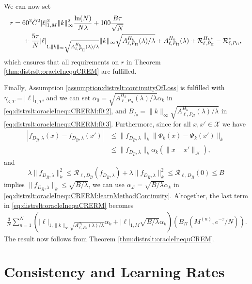\documentclass[letterpaper]{article} %
\newcommand{\fm}{\Phi} %
\newcommand{\hs}[1]{\mathcal{#1}} %
\newcommand{\inputSet}{\mathcal{X}} %
\newcommand{\risk}{\mathcal{R}} %
\newcommand{\Risk}[2]{\risk_{{#1},{#2}}} %
\newcommand{\RiskBayes}[2]{\risk_{{#1},{#2}}^\ast} %
\newcommand{\LearningAlg}[1]{\mathcal{L}_{#1}}
\newcommand{\LocLip}[2]{|#1|_{1,{#2}}} %
\newcommand{\hilbertianHS}{\hs{H}} %
\newcommand{\hilbertianEmbed}{\Pi} %
\newcommand{\ApproxErrorFunc}[3]{A^{#3}_{#1,#2}}
\newcommand{\Aef}{\ApproxErrorFunc{\ell}{P_\hilbertianEmbed}{H_k}}
\newcommand{\RiskOpt}[3]{\Risk{#1}{#2}^{#3\ast}}
\newcommand{\hilbertianEmbedBound}{B_\hilbertianEmbed} %
\begin{document}
We can now set
\begin{align*}
    r & = 60^2 \tilde C^2 \LocLip{\ell}{M}^2 \|k\|_\infty^2 \frac{\ln(N)}{N\lambda} 
        + 100 \frac{B\tau}{\sqrt{N}} \\
        & \hspace{0.5cm} + \frac{5\tau}{N}\LocLip{\ell}{\|k\|_\infty\sqrt{\Aef(\lambda)/\lambda}}\|k\|_\infty\sqrt{\Aef(\lambda)/\lambda}
        + \Aef(\lambda) + \RiskOpt{\ell}{P_\hilbertianEmbed}{H_k} - \RiskBayes{\ell}{P_\hilbertianEmbed},
\end{align*}
which ensures that all requirements on $r$ in Theorem \ref{thm:distrslt:oracleInequCREM} are fulfilled.

Finally, Assumption \ref{assumption:distrslt:continuityOfLoss} is fulfilled with $\gamma_{3,T}=\LocLip{\ell}{T}$,
and we can set $\alpha_0 = \sqrt{\Aef(\lambda)/\lambda}\alpha_k$ in \eqref{eq:distrslt:oracleInequCRERM:f0:2},
and $B_{f_0}=\|k\|_\infty\sqrt{\Aef(\lambda)/\lambda}$ in \eqref{eq:distrslt:oracleInequCRERM:f0:3}.
Furthermore, since for all $x,x'\in\inputSet$ we have
\begin{align*}
    |f_{D_{\hat\hilbertianEmbed},\lambda}(x)-f_{D_{\hat\hilbertianEmbed},\lambda}(x')|
    & \leq \|f_{D_{\hat\hilbertianEmbed},\lambda}\|_k \|\fm_k(x)-\fm_k(x')\|_k \\
    & \leq \|f_{D_{\hat\hilbertianEmbed},\lambda}\|_k \alpha_k(\|x-x'\|_\hilbertianHS),
\end{align*}
and
\begin{equation*}
    \lambda \|f_{D_{\hat\hilbertianEmbed},\lambda}\|_k^2 
    \leq \Risk{\ell}{D_{\hat\hilbertianEmbed}}(f_{D_{\hat\hilbertianEmbed},\lambda}) + \lambda \|f_{D_{\hat\hilbertianEmbed},\lambda}\|_k^2 
    \leq \Risk{\ell}{D_{\hat\hilbertianEmbed}}(0) \leq B
\end{equation*}
implies $\|f_{D_{\hat\hilbertianEmbed},\lambda}\|_k \leq \sqrt{B/\lambda}$,
we can use $\alpha_{\LearningAlg{}}=\sqrt{B/\lambda}\alpha_k$ in \eqref{eq:distrslt:oracleInequCRERM:learnMethodContinuity}.
Altogether, the last term in \eqref{eq:distrslt:oracleInequCRERM} becomes
\begin{align*}
    \frac{3}{N} \sum_{n=1}^N (\LocLip{\ell}{\|k\|_\infty\sqrt{\Aef(\lambda)/\lambda}}\alpha_k + \LocLip{\ell}{M} \sqrt{B/\lambda}\alpha_k)(\hilbertianEmbedBound(M^{(n)},e^{-\tau}/N)).
\end{align*}The result now follows from Theorem \ref{thm:distrslt:oracleInequCREM}.


\section{Consistency and Learning Rates}
\end{document}

